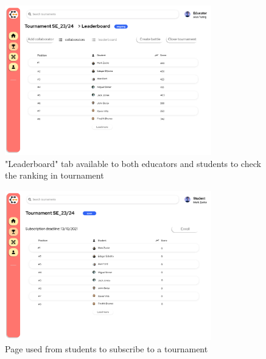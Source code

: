 \begin{figure}[H]
    \centering
    \includegraphics[width=0.8\textwidth]{Mockups/8_educator_tournament_leaderboard.png}
    \caption{"Leaderboard" tab available to both educators and students to check the ranking in tournament}
\end{figure}
\begin{figure}[H]
    \centering
    \includegraphics[width=0.8\textwidth]{Mockups/9_student_tournament_subscription.png}
    \caption{Page used from students to subscribe to a tournament}
\end{figure}

